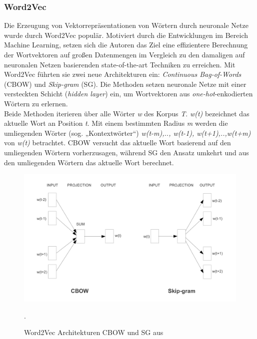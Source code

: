 \documentclass[ngerman]{ttlab-qualify}
\begin{document}
\subsubsection{Word2Vec}
Die Erzeugung von Vektorrepräsentationen von Wörtern durch neuronale Netze wurde durch Word2Vec \parencite{Word2Vec} populär. Motiviert durch die Entwicklungen im Bereich Machine Learning, setzen sich die Autoren das Ziel eine effizientere Berechnung der Wortvektoren auf großen Datenmengen im Vergleich zu den damaligen auf neuronalen Netzen basierenden state-of-the-art Techniken zu erreichen. Mit Word2Vec führten sie zwei neue Architekturen ein: \textit{Continuous Bag-of-Words} (CBOW) und \textit{Skip-gram} (SG). Die Methoden setzen neuronale Netze mit einer versteckten Schicht (\textit{hidden layer}) ein, um Wortvektoren aus \textit{one-hot}-enkodierten Wörtern zu erlernen.\\
Beide Methoden iterieren über alle Wörter \textit{w} des Korpus \textit{T}. \textit{w(t)} bezeichnet das aktuelle Wort an Position \textit{t}. Mit einem bestimmten Radius \textit{m} werden die umliegenden Wörter (sog. „Kontextwörter“) \textit{w(t-m),.., w(t-1), w(t+1),..,w(t+m)} von \textit{w(t)} betrachtet. CBOW versucht das aktuelle Wort basierend auf den umliegenden Wörtern vorherzusagen, während SG den Ansatz umkehrt und aus den umliegenden Wörtern das aktuelle Wort berechnet.
\begin{figure}[H]
\begin{center}
\includegraphics[width=12cm]{grafiken/cbow_skip_gram.jpeg}
\caption[Word2Vec Architekturen CBOW und SG]{Word2Vec Architekturen CBOW und SG aus \textcite[S. 5]{Word2Vec}}.
\label{CBOW_Skip_gram}
\end{center}
\end{figure}
\end{document}

